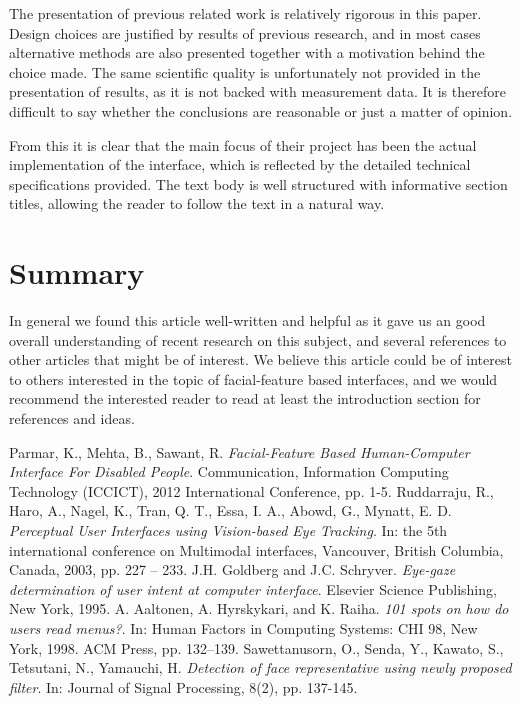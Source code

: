 \documentclass[a4paper,10pt]{article}
\begin{document}
The presentation of previous related work is relatively rigorous in this paper. Design choices are justified by results of previous research, and in most cases alternative methods are also presented together with a motivation behind the choice made. The same scientific quality is unfortunately not provided in the presentation of results, as it is not backed with measurement data. It is therefore difficult to say whether the conclusions are reasonable or just a matter of opinion.


From this it is clear that the main focus of their project has been the actual implementation of the interface, which is reflected by the detailed technical specifications provided. The text body is well structured with informative section titles, allowing the reader to follow the text in a natural way.


\section{Summary}
In general we found this article well-written and helpful as it gave us an good overall understanding of recent research on this subject, and several references to other articles that might be of interest. We believe this article could be of interest to others interested in the topic of facial-feature based interfaces, and we would recommend the interested reader to read at least the introduction section for references and ideas.



\begin{thebibliography}{4}
 Parmar, K., Mehta, B., Sawant, R. \emph{Facial-Feature Based Human-Computer Interface For Disabled People}. Communication, Information Computing Technology (ICCICT), 2012 International Conference, pp. 1-5.
 Ruddarraju, R., Haro, A., Nagel, K., Tran, Q. T., Essa, I. A., Abowd, G., Mynatt, E. D. \emph{Perceptual User Interfaces using Vision-based Eye Tracking}. In: the 5th international conference on Multimodal interfaces, Vancouver, British Columbia, Canada, 2003, pp. 227 – 233.
 J.H. Goldberg and J.C. Schryver. \emph{Eye-gaze determination of user intent at computer interface}. Elsevier Science Publishing, New York, 1995.
 A. Aaltonen, A. Hyrskykari, and K. Raiha. \emph{101 spots on how do users read menus?}. In: Human Factors in Computing Systems: CHI 98, New York, 1998. ACM Press, pp. 132–139.
 Sawettanusorn, O., Senda, Y., Kawato, S., Tetsutani, N., Yamauchi, H. \emph{Detection of face representative using newly proposed filter}. In: Journal of Signal Processing, 8(2), pp. 137-145.

\end{thebibliography}
\end{document}
